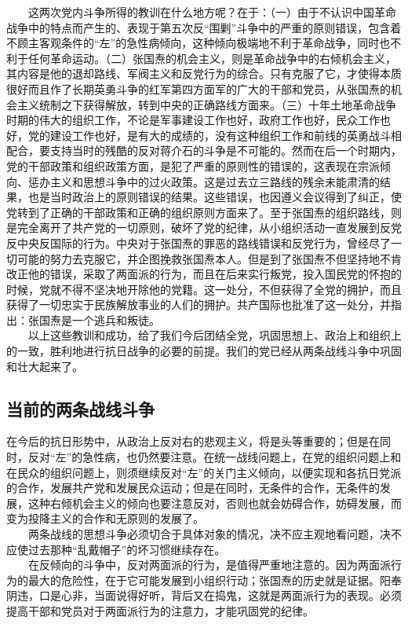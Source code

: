 \documentclass[cn,11pt,chinese]{elegantbook}
\def\myformat#1{\hfil\hfil #1}
\begin{document}
　　这两次党内斗争所得的教训在什么地方呢？在于：（一）由于不认识中国革命战争中的特点而产生的、表现于第五次反“围剿”斗争中的严重的原则错误，包含着不顾主客观条件的“左”的急性病倾向，这种倾向极端地不利于革命战争，同时也不利于任何革命运动。（二）张国焘的机会主义，则是革命战争中的右倾机会主义，其内容是他的退却路线、军阀主义和反党行为的综合。只有克服了它，才使得本质很好而且作了长期英勇斗争的红军第四方面军的广大的干部和党员，从张国焘的机会主义统制之下获得解放，转到中央的正确路线方面来。（三）十年土地革命战争时期的伟大的组织工作，不论是军事建设工作也好，政府工作也好，民众工作也好，党的建设工作也好，是有大的成绩的，没有这种组织工作和前线的英勇战斗相配合，要支持当时的残酷的反对蒋介石的斗争是不可能的。然而在后一个时期内，党的干部政策和组织政策方面，是犯了严重的原则性的错误的，这表现在宗派倾向、惩办主义和思想斗争中的过火政策。这是过去立三路线的残余未能肃清的结果，也是当时政治上的原则错误的结果。这些错误，也因遵义会议得到了纠正，使党转到了正确的干部政策和正确的组织原则方面来了。至于张国焘的组织路线，则是完全离开了共产党的一切原则，破坏了党的纪律，从小组织活动一直发展到反党反中央反国际的行为。中央对于张国焘的罪恶的路线错误和反党行为，曾经尽了一切可能的努力去克服它，并企图挽救张国焘本人。但是到了张国焘不但坚持地不肯改正他的错误，采取了两面派的行为，而且在后来实行叛党，投入国民党的怀抱的时候，党就不得不坚决地开除他的党籍。这一处分，不但获得了全党的拥护，而且获得了一切忠实于民族解放事业的人们的拥护。共产国际也批准了这一处分，并指出：张国焘是一个逃兵和叛徒。\\
　　以上这些教训和成功，给了我们今后团结全党，巩固思想上、政治上和组织上的一致，胜利地进行抗日战争的必要的前提。我们的党已经从两条战线斗争中巩固和壮大起来了。\\
\subsection*{\myformat{当前的两条战线斗争}}
在今后的抗日形势中，从政治上反对右的悲观主义，将是头等重要的；但是在同时，反对“左”的急性病，也仍然要注意。在统一战线问题上，在党的组织问题上和在民众的组织问题上，则须继续反对“左”的关门主义倾向，以便实现和各抗日党派的合作，发展共产党和发展民众运动；但是在同时，无条件的合作，无条件的发展，这种右倾机会主义的倾向也要注意反对，否则也就会妨碍合作，妨碍发展，而变为投降主义的合作和无原则的发展了。\\
　　两条战线的思想斗争必须切合于具体对象的情况，决不应主观地看问题，决不应使过去那种“乱戴帽子”的坏习惯继续存在。\\
　　在反倾向的斗争中，反对两面派的行为，是值得严重地注意的。因为两面派行为的最大的危险性，在于它可能发展到小组织行动；张国焘的历史就是证据。阳奉阴违，口是心非，当面说得好听，背后又在捣鬼，这就是两面派行为的表现。必须提高干部和党员对于两面派行为的注意力，才能巩固党的纪律。\\
\end{document}
